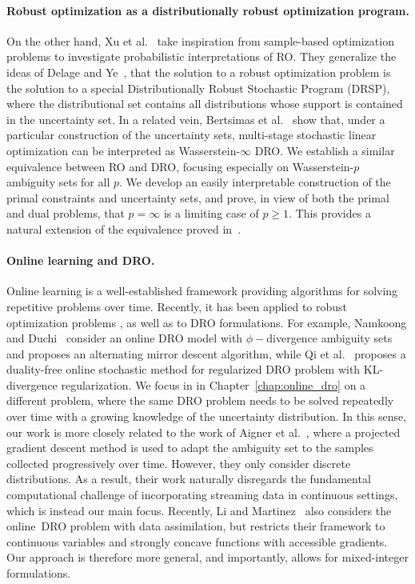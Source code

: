\paragraph{Robust optimization as a distributionally robust optimization program.} On the other hand, Xu et al.~\cite{RO_DRO} take inspiration from sample-based optimization problems to investigate probabilistic interpretations of \gls{RO}. 
They generalize the ideas of Delage and Ye~\cite{dro_3}, that the solution to a robust optimization problem is the solution to a special Distributionally Robust Stochastic Program (DRSP), where the distributional set contains all distributions whose support is contained
in the uncertainty set.
In a related vein, Bertsimas et al.~\cite{wass-p-1} show that, under a particular construction of the uncertainty sets, multi-stage stochastic linear optimization can be interpreted as Wasserstein-$\infty$ \gls{DRO}. 
We establish a similar equivalence between \gls{RO} and \gls{DRO}, focusing especially on Wasserstein-$p$ ambiguity sets for all $p$. 
We develop an easily interpretable construction of the primal constraints and uncertainty sets, and prove, in view of both the primal and dual problems, that $p = \infty$ is a limiting case of $p \geq 1$. 
This provides a natural extension of the equivalence proved in~\cite[Proposition 3]{wass-p-1}.

\paragraph{Online learning and \gls{DRO}.}
Online learning is a well-established framework providing algorithms for solving repetitive problems over time. Recently, it has been applied to robust optimization problems \cite{ho2018online,chen2017robust}, as well as to DRO formulations. For example, Namkoong and Duchi~\cite{namkoong2016stochastic} consider an online DRO model with $\phi-$divergence ambiguity sets and proposes an alternating mirror descent algorithm, while Qi et al.~\cite{qi2021online} proposes a duality-free online stochastic method for regularized DRO problem with KL-divergence regularization. We focus in in Chapter~\ref{chap:online_dro} on a different problem, where the same DRO problem needs to be solved repeatedly over time with a growing knowledge of the uncertainty distribution. In this sense, our work is more closely related to the work of Aigner et al.~\cite{drotime}, where a projected gradient descent method is used to adapt the ambiguity set to the samples collected progressively over time. However, they only consider discrete distributions. As a result, their work naturally disregards the fundamental computational challenge of incorporating streaming data in continuous settings, which is instead our main focus.
Recently, Li and Martinez~\cite{assim} also considers the online~\gls{DRO} problem with data assimilation, but restricts their framework to continuous variables and strongly concave functions with accessible gradients. Our approach is therefore more general, and importantly, allows for mixed-integer formulations. 



